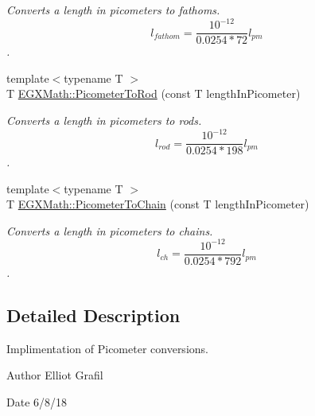 \begin{DoxyCompactItemize}
\begin{DoxyCompactList}\small\item\em Converts a length in picometers to fathoms. \[ l_{fathom}= \frac{10^{-12}}{0.0254 * 72} l_{pm} \]. \end{DoxyCompactList}\item 
{\footnotesize template$<$typename T $>$ }\\T \mbox{\hyperlink{group___e_g_x_math-_conversions-_length_conversions-_s_i-_picometer-_surveyors_gad6009949eef7a49d34a7fa859ecdf0c6}{E\+G\+X\+Math\+::\+Picometer\+To\+Rod}} (const T length\+In\+Picometer)
\begin{DoxyCompactList}\small\item\em Converts a length in picometers to rods. \[ l_{rod}= \frac{10^{-12}}{0.0254 * 198} l_{pm} \]. \end{DoxyCompactList}\item 
{\footnotesize template$<$typename T $>$ }\\T \mbox{\hyperlink{group___e_g_x_math-_conversions-_length_conversions-_s_i-_picometer-_surveyors_gae6629983b2f6ff484d0fc5c773193763}{E\+G\+X\+Math\+::\+Picometer\+To\+Chain}} (const T length\+In\+Picometer)
\begin{DoxyCompactList}\small\item\em Converts a length in picometers to chains. \[ l_{ch}= \frac{10^{-12}}{0.0254 * 792} l_{pm} \]. \end{DoxyCompactList}\end{DoxyCompactItemize}


\subsection{Detailed Description}
Implimentation of Picometer conversions. 

\begin{DoxyAuthor}{Author}
Elliot Grafil 
\end{DoxyAuthor}
\begin{DoxyDate}{Date}
6/8/18 
\end{DoxyDate}
